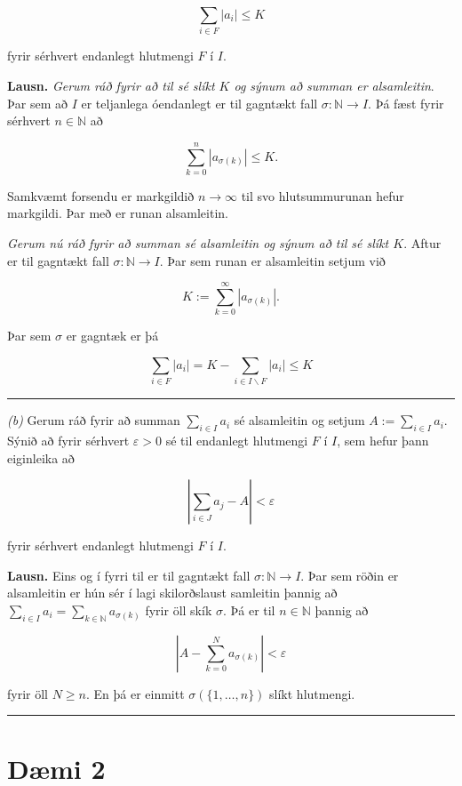 \documentclass[]{book}
\begin{document}
\[
\sum_{i\in F}|a_i| \leq K
\]

fyrir sérhvert endanlegt hlutmengi \(F\) í \(I\).

\textbf{Lausn.} \emph{Gerum ráð fyrir að til sé slíkt \(K\) og sýnum að summan er alsamleitin}. Þar sem að \(I\) er teljanlega óendanlegt er til gagntækt fall \(\sigma: \mathbb N \rightarrow I\). Þá fæst fyrir sérhvert \(n\in\mathbb N\) að

\[
\sum_{k=0}^n|a_{\sigma(k)}|\leq K.
\]

Samkvæmt forsendu er markgildið \(n\rightarrow\infty\) til svo hlutsummurunan hefur markgildi. Þar með er runan alsamleitin.

\emph{Gerum nú ráð fyrir að summan sé alsamleitin og sýnum að til sé slíkt \(K\)}. Aftur er til gagntækt fall \(\sigma:\mathbb N\rightarrow I\). Þar sem runan er alsamleitin setjum við

\[
K:=\sum_{k=0}^\infty|a_{\sigma(k)}|.
\]

Þar sem \(\sigma\) er gagntæk er þá

\[
\sum_{i\in F}|a_i| = K - \sum_{i\in I\backslash F}|a_i|\leq K
\]

\begin{center}\rule{0.5\linewidth}{\linethickness}\end{center}

\emph{(b)} Gerum ráð fyrir að summan \(\sum_{i\in I} a_i\) sé alsamleitin og setjum \(A := \sum_{i\in I} a_i\). Sýnið að fyrir sérhvert \(\varepsilon > 0\) sé til endanlegt hlutmengi \(F\) í \(I\), sem hefur þann eiginleika að

\[
\left|\sum_{i\in J}a_j - A \right| < \varepsilon
\]

fyrir sérhvert endanlegt hlutmengi \(F\) í \(I\).

\textbf{Lausn.} Eins og í fyrri til er til gagntækt fall \(\sigma:\mathbb N\rightarrow I\). Þar sem röðin er alsamleitin er hún sér í lagi skilorðslaust samleitin þannig að \(\sum_{i\in I}a_i = \sum_{k\in\mathbb N}a_{\sigma(k)}\) fyrir öll skík \(\sigma\). Þá er til \(n\in\mathbb N\) þannig að

\[
\left|A - \sum_{k=0}^N a_{\sigma(k)} \right| < \varepsilon
\]

fyrir öll \(N\geq n\). En þá er einmitt \(\sigma(\{1, \dots, n \})\) slíkt hlutmengi.

\begin{center}\rule{0.5\linewidth}{\linethickness}\end{center}

\hypertarget{dmi-2-2}{%
\section*{Dæmi 2}\label{dmi-2-2}}
\end{document}

